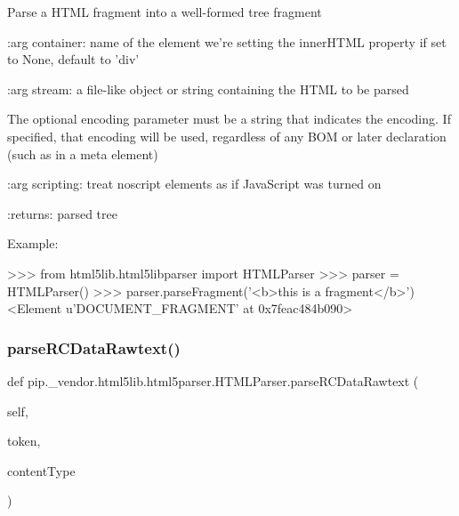 \begin{DoxyVerb}Parse a HTML fragment into a well-formed tree fragment

:arg container: name of the element we're setting the innerHTML
    property if set to None, default to 'div'

:arg stream: a file-like object or string containing the HTML to be parsed

    The optional encoding parameter must be a string that indicates
    the encoding.  If specified, that encoding will be used,
    regardless of any BOM or later declaration (such as in a meta
    element)

:arg scripting: treat noscript elements as if JavaScript was turned on

:returns: parsed tree

Example:

>>> from html5lib.html5libparser import HTMLParser
>>> parser = HTMLParser()
>>> parser.parseFragment('<b>this is a fragment</b>')
<Element u'DOCUMENT_FRAGMENT' at 0x7feac484b090>\end{DoxyVerb}
 \mbox{\label{classpip_1_1__vendor_1_1html5lib_1_1html5parser_1_1HTMLParser_ac1af1b1c5f781129a15b999b2d4b08f2}} 
\subsubsection{\texorpdfstring{parse\+R\+C\+Data\+Rawtext()}{parseRCDataRawtext()}}
{\footnotesize\ttfamily def pip.\+\_\+vendor.\+html5lib.\+html5parser.\+H\+T\+M\+L\+Parser.\+parse\+R\+C\+Data\+Rawtext (\begin{DoxyParamCaption}\item[{}]{self,  }\item[{}]{token,  }\item[{}]{content\+Type }\end{DoxyParamCaption})}

\mbox{\label{classpip_1_1__vendor_1_1html5lib_1_1html5parser_1_1HTMLParser_a8a103866678f6a21dd6554b11ead690c}} 
